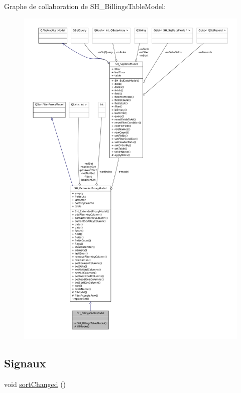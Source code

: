 Graphe de collaboration de S\-H\-\_\-\-Billings\-Table\-Model\-:\nopagebreak
\begin{figure}[H]
\begin{center}
\leavevmode
\includegraphics[width=350pt]{classSH__BillingsTableModel__coll__graph}
\end{center}
\end{figure}
\subsection*{Signaux}
\begin{DoxyCompactItemize}
\item 
void \hyperlink{classSH__ExtendedProxyModel_ad34f69425d6c86a2671cf9f85562a724}{sort\-Changed} ()
\end{DoxyCompactItemize}
